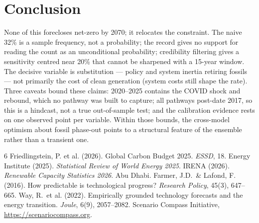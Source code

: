 \documentclass[sigconf, nonacm]{acmart}
\begin{document}
\section{Conclusion}
None of this forecloses net-zero by 2070; it relocates the constraint. The naive 32\% is a sample frequency, not a probability; the record gives no support for reading the count as an unconditional probability; credibility filtering gives a sensitivity centred near 20\% that cannot be sharpened with a 15-year window. The decisive variable is substitution --- policy and system inertia retiring fossils --- not primarily the cost of clean generation (system costs still shape the rate). Three caveats bound these claims: 2020--2025 contains the COVID shock and rebound, which no pathway was built to capture; all pathways post-date 2017, so this is a hindcast, not a true out-of-sample test; and the calibration evidence rests on one observed point per variable. Within those bounds, the cross-model optimism about fossil phase-out points to a structural feature of the ensemble rather than a transient one.


\begin{thebibliography}{6}
\setlength{\itemsep}{0pt}\setlength{\parsep}{0pt}
 Friedlingstein, P. et al. (2026). Global Carbon Budget 2025. \emph{ESSD}, 18.
 Energy Institute (2025). \emph{Statistical Review of World Energy 2025}.
 IRENA (2026). \emph{Renewable Capacity Statistics 2026}. Abu Dhabi.
 Farmer, J.D.\ \& Lafond, F. (2016). How predictable is technological progress? \emph{Research Policy}, 45(3), 647--665.
 Way, R.\ et al. (2022). Empirically grounded technology forecasts and the energy transition. \emph{Joule}, 6(9), 2057--2082.
 Scenario Compass Initiative, \url{https://scenariocompass.org}.
\end{thebibliography}
\end{document}
